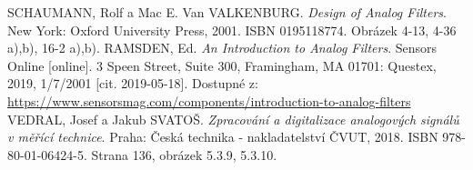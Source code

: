 \begin{thebibliography}{999}
SCHAUMANN, Rolf a Mac E. Van VALKENBURG. \textit{Design of Analog Filters}. New York: Oxford University Press, 2001. ISBN 0195118774. Obrázek 4-13, 4-36 a),b), 16-2 a),b).
RAMSDEN, Ed. \textit{An Introduction to Analog Filters}. Sensors Online [online]. 3 Speen Street, Suite 300, Framingham, MA 01701: Questex, 2019, 1/7/2001 [cit. 2019-05-18]. Dostupné z: \url{https://www.sensorsmag.com/components/introduction-to-analog-filters}
VEDRAL, Josef a Jakub SVATOŠ. \textit{Zpracování a digitalizace analogových signálů v měřící technice}. Praha: Česká technika - nakladatelství ČVUT, 2018. ISBN 978-80-01-06424-5. Strana 136, obrázek 5.3.9, 5.3.10.
\end{thebibliography}